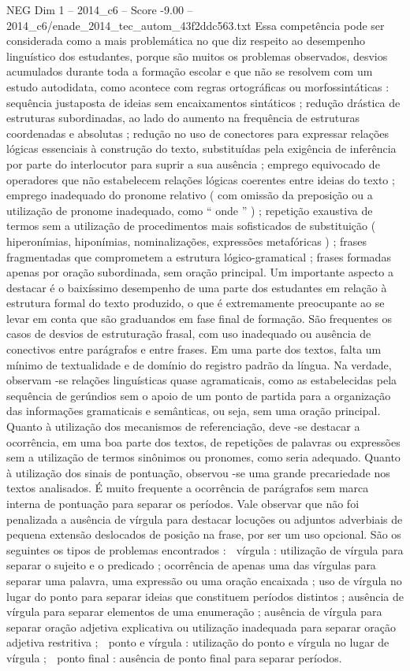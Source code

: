 \begin{textsample}{NEG Dim 1 – 2014\_c6 – Score -9.00 – 2014\_c6/enade\_2014\_tec\_autom\_43f2ddc563.txt}
Essa competência pode ser considerada como a mais problemática no que diz respeito ao desempenho linguístico dos estudantes, porque são muitos os problemas observados, desvios acumulados durante toda a formação escolar e que não se resolvem com um estudo autodidata, como acontece com regras ortográficas ou morfossintáticas : sequência justaposta de ideias sem encaixamentos sintáticos ; redução drástica de estruturas subordinadas, ao lado do aumento na frequência de estruturas coordenadas e absolutas ; redução no uso de conectores para expressar relações lógicas essenciais à construção do texto, substituídas pela exigência de inferência por parte do interlocutor para suprir a sua ausência ; emprego equivocado de operadores que não estabelecem relações lógicas coerentes entre ideias do texto ; emprego inadequado do pronome relativo ( com omissão da preposição ou a utilização de pronome inadequado, como “ onde ” ) ; repetição exaustiva de termos sem a utilização de procedimentos mais sofisticados de substituição ( hiperonímias, hiponímias, nominalizações, expressões metafóricas ) ; frases fragmentadas que comprometem a estrutura lógico-gramatical ; frases formadas apenas por oração subordinada, sem oração principal.
Um importante aspecto a destacar é o baixíssimo desempenho de uma parte dos estudantes em relação à estrutura formal do texto produzido, o que é extremamente preocupante ao se levar em conta que são graduandos em fase final de formação.
São frequentes os casos de desvios de estruturação frasal, com uso inadequado ou ausência de conectivos entre parágrafos e entre frases.
Em uma parte dos textos, falta um mínimo de textualidade e de domínio do registro padrão da língua.
Na verdade, observam -se relações linguísticas quase agramaticais, como as estabelecidas pela sequência de gerúndios sem o apoio de um ponto de partida para a organização das informações gramaticais e semânticas, ou seja, sem uma oração principal.
Quanto à utilização dos mecanismos de referenciação, deve -se destacar a ocorrência, em uma boa parte dos textos, de repetições de palavras ou expressões sem a utilização de termos sinônimos ou pronomes, como seria adequado.
Quanto à utilização dos sinais de pontuação, observou -se uma grande precariedade nos textos analisados.
É muito frequente a ocorrência de parágrafos sem marca interna de pontuação para separar os períodos.
Vale observar que não foi penalizada a ausência de vírgula para destacar locuções ou adjuntos adverbiais de pequena extensão deslocados de posição na frase, por ser um uso opcional.
São os seguintes os tipos de problemas encontrados :  vírgula : utilização de vírgula para separar o sujeito e o predicado ; ocorrência de apenas uma das vírgulas para separar uma palavra, uma expressão ou uma oração encaixada ; uso de vírgula no lugar do ponto para separar ideias que constituem períodos distintos ; ausência de vírgula para separar elementos de uma enumeração ; ausência de vírgula para separar oração adjetiva explicativa ou utilização inadequada para separar oração adjetiva restritiva ;  ponto e vírgula : utilização do ponto e vírgula no lugar de vírgula ;  ponto final : ausência de ponto final para separar períodos.

\end{textsample}
